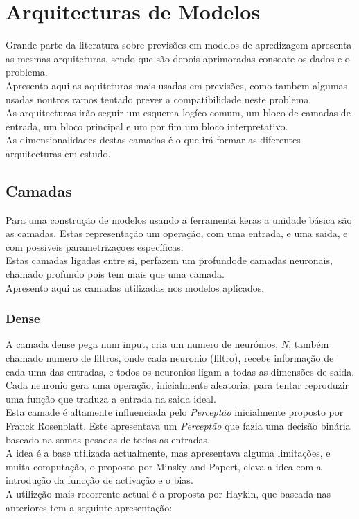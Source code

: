 \chapter{Arquitecturas de Modelos\label{ch:arquiteturas_modelos}}

Grande parte da literatura sobre previsões em modelos de apredizagem apresenta as mesmas arquiteturas, sendo que são depois aprimoradas consoate os dados e o problema. \\
Apresento aqui as aquiteturas mais usadas em previsões, como tambem algumas usadas noutros ramos tentado prever a compatibilidade neste problema. \\
As arquitecturas irão seguir um esquema logíco comum, um bloco de camadas de entrada, um bloco principal e um por fim um bloco interpretativo. \\
As dimensionalidades destas camadas é o que irá formar as diferentes arquitecturas em estudo. \\

\section{Camadas\label{se:layers}}

Para uma construção de modelos usando a ferramenta \href{https://keras.io/}{keras} a unidade básica são as camadas. Estas representação um operação, com uma entrada, e uma saida, e com possiveis parametrizaçoes específicas. \\
Estas camadas ligadas entre si, perfazem um \"profundo\" de camadas neuronais, chamado profundo pois tem mais  que uma camada. \\

Apresento aqui as camadas utilizadas nos modelos aplicados.\\

\subsection{Dense\label{se:dense_layer}}

A camada dense pega num input, cria um numero de neurónios, \textit{N}, também chamado numero de filtros, onde cada neuronio (filtro), recebe informação de cada uma das entradas, e todos os neuronios ligam a todas as dimensões de saida. \\
Cada neuronio gera uma operação, inicialmente aleatoria, para tentar reproduzir uma função que traduza a entrada na saida ideal. \\
Esta camade é altamente influenciada pelo \textit{Perceptão} inicialmente proposto por Franck Rosenblatt\cite{Rosenblatt1958}. Este apresentava um \textit{Perceptão} que fazia uma decisão binária baseado na somas pesadas de todas as entradas. \\
A idea é a base utilizada actualmente, mas apresentava alguma limitações, e muita computação, o proposto por Minsky and Papert\cite{Minsky1969}, eleva a idea com a introdução da funcção de activação e o bias. \\
A utilizção mais recorrente actual é a proposta por Haykin\cite{Haykin1999}, que baseada nas anteriores tem a seguinte apresentação:

